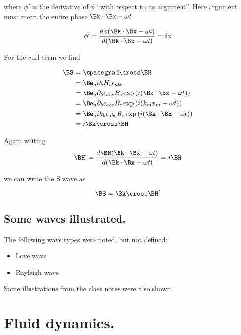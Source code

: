 where $\phi'$ is the derivative of $\phi$ ``with respect to its argument''.   Here argument must mean the entire phase $\Bk \cdot \Bx - \omega t$

\begin{equation}\label{eqn:continuumL8:170}
\phi' = \frac{ d\phi( \Bk \cdot \Bx - \omega t )}{ d(\Bk \cdot \Bx - \omega t) } = i \phi
\end{equation}

For the curl term we find

\begin{align*}
\BS
&= \spacegrad \cross \BH \\
&= \Be_a \partial_b H_c \epsilon_{a b c} \\
&= \Be_a \partial_b \epsilon_{a b c} B_c \exp\left( i ( \Bk \cdot \Bx - \omega t) \right) \\
&= \Be_a \partial_b \epsilon_{a b c} B_c \exp\left( i ( k_m x_m - \omega t) \right) \\
&= \Be_a i k_b \epsilon_{a b c} B_c \exp\left( i ( \Bk \cdot \Bx - \omega t) \right) \\
&= i \Bk \cross \BH
\end{align*}

Again writing
\begin{equation}\label{eqn:continuumL8:190}
\BH' = \frac{ d\BH( \Bk \cdot \Bx - \omega t )}{ d(\Bk \cdot \Bx - \omega t) } = i \BH
\end{equation}

we can write the S wave as

\begin{equation}\label{eqn:continuumL8:210}
\BS = \Bk \cross \BH'
\end{equation}

\subsection{Some waves illustrated.}

The following wave types were noted, but not defined:

\begin{itemize}
\item Love wave
\item Rayleigh wave
\end{itemize}

Some illustrations from the class notes were also shown.

\section{Fluid dynamics.}

